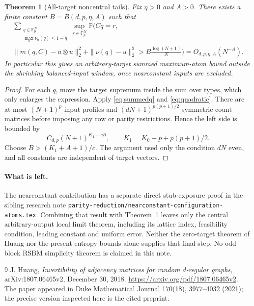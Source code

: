 \documentclass[11pt]{article}
\newtheorem{theorem}{Theorem}
\newcommand{\Fp}{\mathbb F_p}
\newcommand{\Prob}{\mathbb P}
\begin{document}
\begin{theorem}[All-target noncentral tails]\label{thm:tails}
Fix $\eta>0$ and $A>0$. There exists a finite constant
$B=B(d,p,\eta,A)$ such that
\begin{multline}
 \sum_{\substack{q\in\Fp^N\\\max_a\nu_a(q)\le1-\eta}}
 \sup_{r\in\Fp^N}\Prob\biggl(Cq=r,\\
 \|m(q,C)-u\otimes u\|_2^2+\|\nu(q)-u\|_2^2
       >B\frac{\log(N+1)}N\biggr)
 =O_{d,p,\eta,A}(N^{-A}).\label{eq:tailtheorem}
\end{multline}
In particular this gives an arbitrary-target summed maximum-atom
bound outside the shrinking balanced-input window, once
nearconstant inputs are excluded.
\end{theorem}
\begin{proof}
For each $q$, move the target supremum inside the sum over types,
which only enlarges the expression. Apply
\eqref{eq:summedq} and \eqref{eq:quadratic}. There are at most
$(N+1)^p$ input profiles and $(dN+1)^{p(p+1)/2}$ symmetric count
matrices before imposing any row or parity restrictions. Hence the
left side is bounded by
\[
 C_{d,p}(N+1)^{K_1-cB},\qquad
 K_1=K_0+p+p(p+1)/2.
\]
Choose $B>(K_1+A+1)/c$. The argument used only the condition
$dN$ even, and all constants are independent of target vectors.
\end{proof}

\paragraph{What is left.}
The nearconstant contribution has a separate direct stub-exposure
proof in the sibling research note
\texttt{parity-reduction/nearconstant-configuration-atoms.tex}.
Combining that result with Theorem~\ref{thm:tails} leaves only the
central arbitrary-output local limit theorem, including its lattice
index, feasibility condition, leading constant and uniform error.
Neither the zero-target theorem of Huang nor the present entropy
bounds alone supplies that final step. No odd-block RSBM simplicity
theorem is claimed in this note.

\begin{thebibliography}{9}
 J. Huang,
\emph{Invertibility of adjacency matrices for random $d$-regular graphs},
arXiv:1807.06465v2, December 30, 2018.
\url{https://arxiv.org/pdf/1807.06465v2}.
The paper appeared in Duke Mathematical Journal 170(18), 3977--4032
(2021); the precise version inspected here is the cited preprint.
\end{thebibliography}
\end{document}
